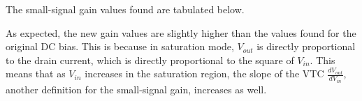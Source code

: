 \FloatBarrier

The small-signal gain values found are tabulated below.

\FloatBarrier

\begin{table}[h!]
	\centering
	\caption{Gain of Common Source Amplifier with $10$ \si{\milli\volt} Higher Bias}
	\label{tab:gain_part2}
\end{table}

\FloatBarrier

As expected, the new gain values are slightly higher than the values found for the original DC bias.
This is because in saturation mode, $V_{out}$ is directly proportional to the drain current, which is directly proportional to the square of $V_{in}$. This means that as $V_{in}$ increases in the saturation region, the slope of the VTC $\frac{dV_{out}}{dV_{in}}$, another definition for the small-signal gain, increases as well. \\
